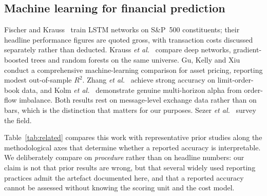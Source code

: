 \documentclass[conference]{IEEEtran}
\begin{document}
\subsection{Machine learning for financial prediction}
Fischer and Krauss~\cite{fischer2018} train LSTM networks on S\&P~500
constituents; their headline performance figures are quoted gross, with
transaction costs discussed separately rather than deducted. Krauss \emph{et
al.}~\cite{krauss2017} compare deep networks, gradient-boosted trees and random
forests on the same universe.
Gu, Kelly and Xiu~\cite{gu2020} conduct a comprehensive machine-learning
comparison for asset pricing, reporting modest out-of-sample $R^2$. Zhang
\emph{et al.}~\cite{zhang2019} achieve strong accuracy on limit-order-book data,
and Kolm \emph{et al.}~\cite{kolm2023} demonstrate genuine multi-horizon alpha
from order-flow imbalance. Both results rest on message-level exchange data
rather than on bars, which is the distinction that matters for our purposes.
Sezer \emph{et al.}~\cite{sezer2020} survey the field.

Table~\ref{tab:related} compares this work with representative prior studies
along the methodological axes that determine whether a reported accuracy is
interpretable. We deliberately compare on \emph{procedure} rather than on
headline numbers: our claim is not that prior results are wrong, but that
several widely used reporting practices admit the artefact documented here, and
that a reported accuracy cannot be assessed without knowing the scoring unit and
the cost model.
\end{document}
